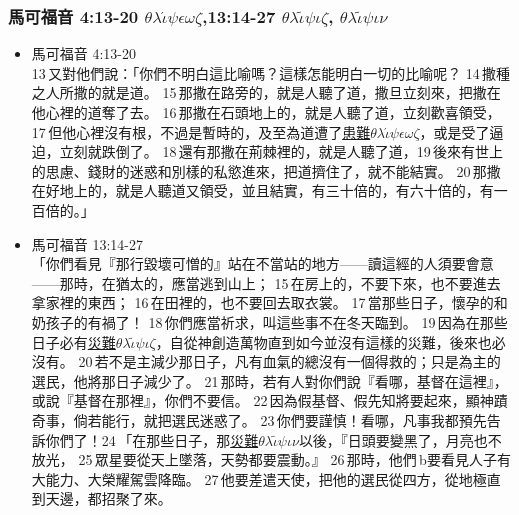  \subsubsection{馬可福音 4:13-20 $\theta$$\lambda$$\acute{\iota}$$\psi$$\epsilon$$\omega$$\zeta$,13:14-27 $\theta$$\lambda$$\tilde{\iota}$$\psi$$\iota$$\zeta$, $\theta$$\lambda$$\tilde{\iota}$$\psi$$\iota$$\nu$} 
 \begin{itemize} 
\itemsep-.25em
\item {馬可福音 4:13-20}\\
13 又對他們說：「你們不明白這比喻嗎？這樣怎能明白一切的比喻呢？ 14 撒種之人所撒的就是道。 15 那撒在路旁的，就是人聽了道，撒旦立刻來，把撒在他心裡的道奪了去。 16 那撒在石頭地上的，就是人聽了道，立刻歡喜領受， 17 但他心裡沒有根，不過是暫時的，及至為道遭了\underline{患難$\theta$$\lambda$$\acute{\iota}$$\psi$$\epsilon$$\omega$$\zeta$}，或是受了逼迫，立刻就跌倒了。 18 還有那撒在荊棘裡的，就是人聽了道，19 後來有世上的思慮、錢財的迷惑和別樣的私慾進來，把道擠住了，就不能結實。 20 那撒在好地上的，就是人聽道又領受，並且結實，有三十倍的，有六十倍的，有一百倍的。」
\item{馬可福音 13:14-27}   \\
「你們看見『那行毀壞可憎的』站在不當站的地方——讀這經的人須要會意——那時，在猶太的，應當逃到山上； 15 在房上的，不要下來，也不要進去拿家裡的東西； 16 在田裡的，也不要回去取衣裳。 17 當那些日子，懷孕的和奶孩子的有禍了！ 18 你們應當祈求，叫這些事不在冬天臨到。 19 因為在那些日子必有\underline{災難$\theta$$\lambda$$\tilde{\iota}$$\psi$$\iota$$\zeta$}，自從神創造萬物直到如今並沒有這樣的災難，後來也必沒有。 20 若不是主減少那日子，凡有血氣的總沒有一個得救的；只是為主的選民，他將那日子減少了。 21 那時，若有人對你們說『看哪，基督在這裡』，或說『基督在那裡』，你們不要信。 22 因為假基督、假先知將要起來，顯神蹟奇事，倘若能行，就把選民迷惑了。 23 你們要謹慎！看哪，凡事我都預先告訴你們了！24 「在那些日子，那\underline{災難$\theta$$\lambda$$\tilde{\iota}$$\psi$$\iota$$\nu$}以後，『日頭要變黑了，月亮也不放光， 25 眾星要從天上墜落，天勢都要震動。』 26 那時，他們 b要看見人子有大能力、大榮耀駕雲降臨。 27 他要差遣天使，把他的選民從四方，從地極直到天邊，都招聚了來。  
\end{itemize}  

